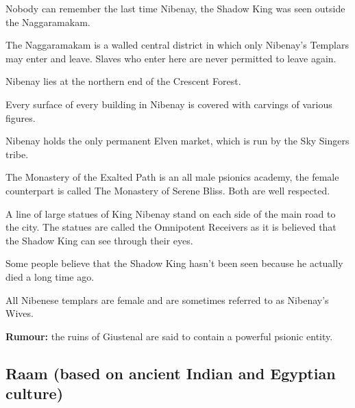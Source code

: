 \begin{multicols}{2}
\begin{description}
    \item Nobody can remember the last time Nibenay, the Shadow King was seen outside the Naggaramakam.
    \item The Naggaramakam is a walled central district in which only Nibenay’s Templars may enter and leave. Slaves who enter here are never permitted to leave again.
    \item Nibenay lies at the northern end of the Crescent Forest.
    \item Every surface of every building in Nibenay is covered with carvings of various figures.
    \item Nibenay holds the only permanent Elven market, which is run by the Sky Singers tribe.
    \item The Monastery of the Exalted Path is an all male psionics academy, the female counterpart is called The Monastery of Serene Bliss. Both are well respected.
    \item A line of large statues of King Nibenay stand on each side of the main road to the city. The statues are called the Omnipotent Receivers as it is believed that the Shadow King can see through their eyes.
    \item Some people believe that the Shadow King hasn’t been seen because he actually died a long time ago.
    \item All Nibenese templars are female and are sometimes referred to as Nibenay’s Wives.
    \item \textbf{Rumour:} the ruins of Giustenal are said to contain a powerful psionic entity.
\end{description}

\subsection{Raam (based on ancient Indian and Egyptian culture)}


\end{multicols}
